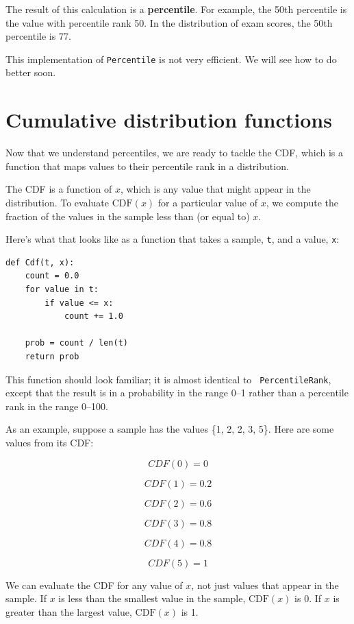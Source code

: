 \documentclass[12pt]{book}
\begin{document}
The result of this calculation is a {\bf percentile}.  For example,
the 50th percentile is the value with percentile rank 50.  In the
distribution of exam scores, the 50th percentile is 77.

This implementation of {\tt Percentile} is not very efficient.  We
will see how to do better soon.



\section{Cumulative distribution functions}

\newcommand{\CDF}{\mathrm{CDF}}

Now that we understand percentiles, we are ready to tackle the
CDF, which is a function that
maps values to their percentile rank in a distribution.

The CDF is a function of $x$, which is any value that might appear
in the distribution.  To evaluate $\CDF(x)$ for a particular value of
$x$, we compute the fraction of the values in the sample less than (or
equal to) $x$.

Here's what that looks like as a function that takes a sample,
{\tt t}, and a value, {\tt x}:
%
\begin{verbatim}
def Cdf(t, x):
    count = 0.0
    for value in t:
        if value <= x:
            count += 1.0

    prob = count / len(t)
    return prob
\end{verbatim}

This function should look familiar; it is almost identical to {\tt
  PercentileRank}, except that the result is in a probability in the
range 0--1 rather than a percentile rank in the range 0--100.

As an example, suppose a sample has the values \{1, 2, 2, 3, 5\}.
Here are some values from its CDF:

\[ CDF(0) = 0  \]

\[ CDF(1) = 0.2 \]

\[ CDF(2) = 0.6 \]

\[ CDF(3) = 0.8 \]

\[ CDF(4) = 0.8 \]

\[ CDF(5) = 1 \]

We can evaluate the CDF for any value of $x$, not just
values that appear in the sample.
If $x$ is less than the smallest value in the sample, $\CDF(x)$ is 0.
If $x$ is greater than the largest value, $\CDF(x)$ is 1.
\end{document}
